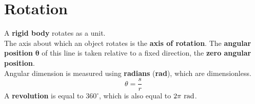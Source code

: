 \documentclass[../AP_Physics_C.tex]{subfiles}
\begin{document}
	\section{Rotation}
		A \textbf{rigid body} rotates as a unit. \\
		The axis about which an object rotates is the \textbf{axis of rotation}. The \textbf{angular position} $\bm{\theta}$ of this line is taken relative to a fixed direction, the \textbf{zero angular position}. \\
		Angular dimension is measured using \textbf{radians} (\textbf{rad}), which are dimensionless.
		\[\theta = \frac{s}{r}\]
		A \textbf{revolution} is equal to $360^\circ$, which is also equal to $2\pi\,\operatorname{rad}$.
\end{document}
